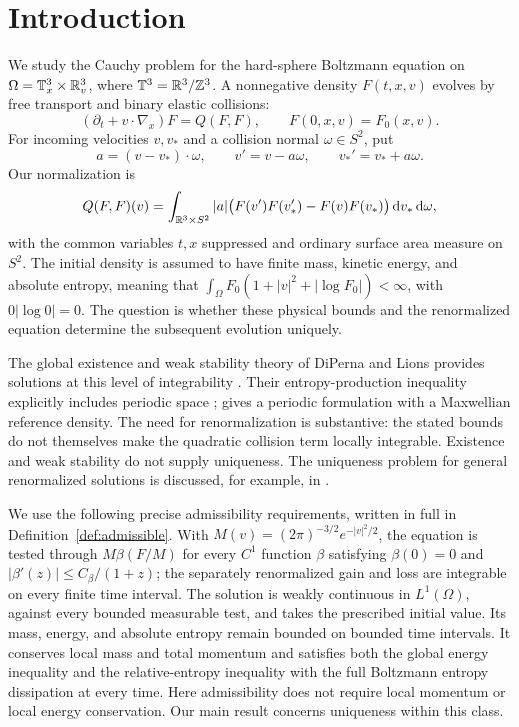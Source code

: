 \section{Introduction}\label{sec:introduction}

We study the Cauchy problem for the hard-sphere Boltzmann equation on
\(\Omega=\mathbb T^3_x\times\mathbb R^3_v\), where
\(\mathbb T^3=\mathbb R^3/\mathbb Z^3\). A nonnegative density \(F(t,x,v)\)
evolves by free transport and binary elastic collisions:
\[
 (\partial_t+v\cdot\nabla_x)F=Q(F,F),\qquad F(0,x,v)=F_0(x,v).
\]
For incoming velocities \(v,v_*\) and a collision normal
\(\omega\in S^2\), put
\[
 a=(v-v_*)\cdot\omega,\qquad
 v'=v-a\omega,\qquad v_*'=v_*+a\omega.
\]
Our normalization is
\[
 Q(F,F)(v)=\int_{\mathbb R^3\times S^2}|a|
       \bigl(F(v')F(v_*')-F(v)F(v_*)\bigr)\,\mathrm d v_*\,\mathrm d\omega,
\]
with the common variables \(t,x\) suppressed and ordinary surface area
measure on \(S^2\). The initial density is assumed to have finite
mass, kinetic energy, and absolute entropy, meaning that
\(\int_\Omega F_0(1+|v|^2+|\log F_0|)<\infty\), with
\(0|\log0|=0\). The question is whether these physical bounds and the
renormalized equation determine the subsequent evolution uniquely.

The global existence and weak stability theory of DiPerna and Lions
provides solutions at this level of integrability
\cite{DiPernaLions1989}. Their entropy-production inequality explicitly
includes periodic space \cite{DiPernaLions1991};
\cite[Theorem~4.1]{LevermoreMasmoudi2010} gives a periodic formulation
with a Maxwellian reference density. The need for renormalization is
substantive: the stated bounds do not themselves make the quadratic
collision term locally integrable. Existence and weak stability do not
supply uniqueness. The uniqueness problem for general renormalized
solutions is discussed, for example, in
\cite[Section~2]{Silvestre2022}.

We use the following precise admissibility requirements, written in
full in Definition~\ref{def:admissible}. With
\(M(v)=(2\pi)^{-3/2}e^{-|v|^2/2}\), the equation is tested through
\(M\beta(F/M)\) for every \(C^1\) function \(\beta\) satisfying
\(\beta(0)=0\) and \(|\beta'(z)|\le C_\beta/(1+z)\); the separately
renormalized gain and loss are integrable on every finite time interval.
The solution is weakly continuous in \(L^1(\Omega)\), against every
bounded measurable test, and takes the prescribed initial value.
Its mass, energy, and absolute entropy remain bounded on bounded time
intervals. It conserves local mass and total momentum and satisfies
both the global energy inequality and the relative-entropy inequality
with the full Boltzmann entropy dissipation at every time.
Here admissibility does not require local momentum or local energy
conservation. Our main result concerns uniqueness within this class.

